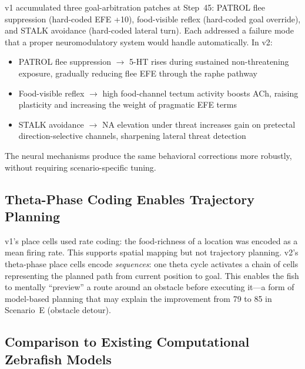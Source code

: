 \documentclass[11pt,a4paper]{article}
\begin{document}
v1 accumulated three goal-arbitration patches at Step~45:
PATROL flee suppression (hard-coded EFE +10), food-visible reflex
(hard-coded goal override), and STALK avoidance (hard-coded lateral turn).
Each addressed a failure mode that a proper neuromodulatory system would
handle automatically.
In v2:
\begin{itemize}[nosep]
  \item PATROL flee suppression $\to$ 5-HT rises during sustained non-threatening
    exposure, gradually reducing flee EFE through the raphe pathway
  \item Food-visible reflex $\to$ high food-channel tectum activity boosts ACh,
    raising plasticity and increasing the weight of pragmatic EFE terms
  \item STALK avoidance $\to$ NA elevation under threat increases gain on
    pretectal direction-selective channels, sharpening lateral threat detection
\end{itemize}
The neural mechanisms produce the same behavioral corrections more robustly,
without requiring scenario-specific tuning.

\subsection{Theta-Phase Coding Enables Trajectory Planning}

v1's place cells used rate coding: the food-richness of a location was
encoded as a mean firing rate.
This supports spatial mapping but not trajectory planning.
v2's theta-phase place cells encode \emph{sequences}: one theta cycle
activates a chain of cells representing the planned path from current
position to goal.
This enables the fish to mentally ``preview'' a route around an obstacle
before executing it---a form of model-based planning that may explain
the improvement from 79 to 85 in Scenario~E (obstacle detour).

\subsection{Comparison to Existing Computational Zebrafish Models}
\end{document}
